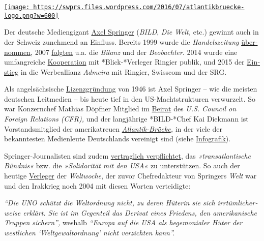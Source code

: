 \href{https://swprs.org/2017/03/01/eine-bruecke-ueber-den-atlantik/}{\texttt{[image: https://swprs.files.wordpress.com/2016/07/atlantikbruecke-logo.png?w=600]}}

Der deutsche Medien­gigant
\href{https://de.wikipedia.org/wiki/Axel_Springer_SE}{Axel Springer}
(\emph{BILD}, \emph{Die Welt,} etc.) gewinnt auch in der Schweiz
zu­neh­mend an Einfluss. Bereits 1999 wurde die \emph{Handels­zeitung}
\href{https://de.wikipedia.org/wiki/Handelszeitung}{über­nommen}, 2007
\href{https://de.wikipedia.org/wiki/Jean_Frey_AG}{folgten} u.a. die
\emph{Bilanz} und der \emph{Beobachter}. 2014 wurde eine umfang­reiche
\href{http://www.blick.ch/news/wirtschaft/medien-ringier-und-axel-springer-gruenden-gemeinschaftsunternehmen-in-der-schweiz-id3357037.html}{Koope­ration}
mit *Blick-*Verleger Ringier publik, und 2015 der
\href{http://www.persoenlich.com/marketing/die-werbeallianz-prasentiert-sich-zum-ersten-mal-der-branche}{Ein­stieg}
in die Werbe­allianz \emph{Admeira} mit Ringier, Swiss­com und der SRG.

Als angel­säch­sische
\href{https://de.wikipedia.org/wiki/Lizenzzeitung}{Li­zenz­grün­dung}
von 1946 ist Axel Springer -- wie die meisten deutschen Leit­medien --
bis heute tief in den US-Macht­­struk­turen ver­wur­zelt. So war
Konzern­­chef Mathias Döpfner Mit­glied im
\href{https://www.cfr.org/global-board-advisors}{Bei­rat} des \emph{U.S.
Council on Foreign Relations (CFR),} und der lang­jährige *BILD-*​Chef
Kai Diek­­mann ist Vor­stands­mitglied der ame­ri­ka­treuen
\emph{\href{https://de.wikipedia.org/wiki/Atlantik-Br\%C3\%BCcke}{Atlantik-Brücke},}
in der viele der bekanntesten Medien­leute Deutsch­lands ver­ei­nigt
sind (siehe
\href{https://swprs.org/netzwerk-medien-deutschland/}{Infografik}).

Springer-Journa­listen sind zudem
\href{https://bildblog.de/89290/axel-springer-gibt-sich-neue-alte-grundsaetze/}{ver­­trag­­lich
ver­pfli­ch­tet}, das \emph{»trans­at­lantische Bündnis«} bzw. die
\emph{»Soli­da­rität mit den USA«} zu unter­stützen. So auch der heutige
\href{https://de.wikipedia.org/wiki/Roger_K\%C3\%B6ppel}{Ver­leger} der
\emph{Welt­woche}, der zuvor Chef­re­dakteur von Springers \emph{Welt}
war und den Irak­krieg noch 2004 mit diesen Worten ver­tei­digte:

\emph{``Die UNO schützt die Welt­ordnung nicht, zu deren Hüterin sie
sich irr­tüm­licher­weise erklärt. Sie ist im Gegen­teil das Derivat
eines Friedens, den ameri­ka­nische Truppen sichern'',} weshalb
\emph{``Europa auf die USA als hege­mon­ialer Hüter der west­lichen
`Welt­gewalt­ordnung' nicht ver­zichten kann''.}

